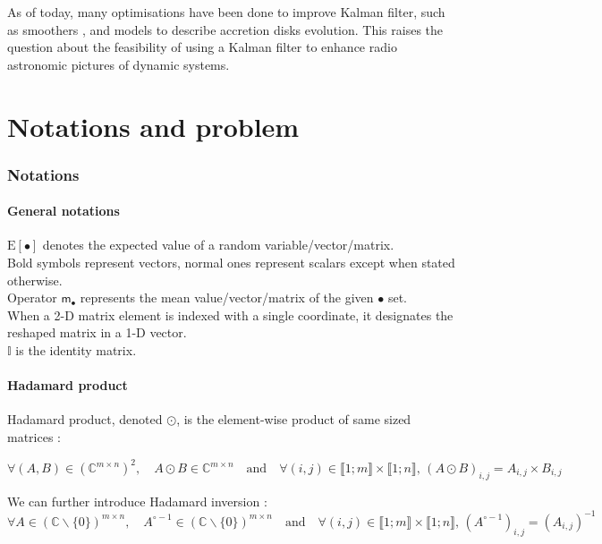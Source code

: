 \documentclass[titlepage]{article}
\newcommand{\hinv}[1]{#1^{\circ-1}} %
\newcommand{\moy}[1]{\boldsymbol{\mathsf{m}}_{#1}}
\renewcommand{\expval}[1]{\text{E}\left[#1\right]}
\begin{document}
	As of today, many optimisations have been done to improve Kalman filter, such as smoothers \cite{RTS}, and models to describe accretion disks evolution. This raises the question about the feasibility of using a Kalman filter to enhance radio astronomic pictures of dynamic systems.
	
	\newpage
	\part{Notations and problem}
	\section{Notations}
	
	\subsection{General notations}
	
	$\expval{\bullet}$ denotes the expected value of a random variable/vector/matrix.\\
	
	Bold symbols represent vectors, normal ones represent scalars except when stated otherwise.\\
	
	Operator $\moy{\bullet}$ represents the mean value/vector/matrix of the given $\bullet$ set.\\
	
	When a 2-D matrix element is indexed with a single coordinate, it designates the reshaped matrix in a 1-D vector.\\
	
	$\mathbb{I}$ is the identity matrix.
	
	
		\subsection{Hadamard product}
	
	Hadamard product, denoted $\odot$, is the element-wise product of same sized matrices :
	
	$$
	\forall (A,B)\in\left(\mathbb{C}^{m\times n}\right)^2, \quad A\odot B\in\mathbb{C}^{m\times n} \quad\text{and}\quad \forall (i,j)\in\llbracket1;m\rrbracket\times\llbracket1;n\rrbracket,\, (A\odot B)_{i,j} = A_{i,j}\times B_{i,j}
	$$
	
	We can further introduce Hadamard inversion :
	$$
	\forall A \in \left(\mathbb{C}\backslash\{0\}\right)^{m\times n},\quad \hinv{A}\in\left(\mathbb{C}\backslash\{0\}\right)^{m\times n} \quad\text{and}\quad \forall (i,j)\in\llbracket1;m\rrbracket\times\llbracket1;n\rrbracket,\, \left(\hinv{A}\right)_{i,j} = \left(A_{i,j}\right)^{-1}
	$$ 
	
\end{document}
